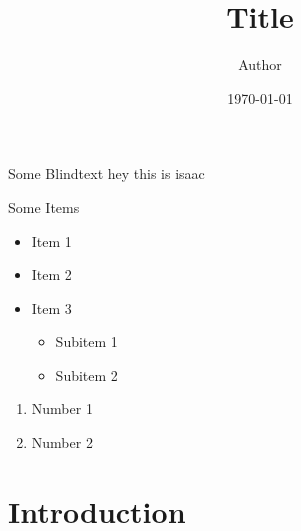 \documentclass{beamer}
\title{Title}
\author{Author}
\date{\today{}}
\begin{document}
\begin{frame}
    \titlepage
\end{frame}

\begin{frame}{Some Blindtext}
hey this is isaac
\end{frame}

\begin{frame}{Some Items}
    \begin{itemize}
        \item Item 1
        \item Item 2
        \item Item 3
        \begin{itemize}
            \item Subitem 1
            \item Subitem 2
        \end{itemize}
    \end{itemize}

    \begin{enumerate}
        \item Number 1
        \item Number 2
    \end{enumerate}
\end{frame}

\section{Introduction}
\end{document}

